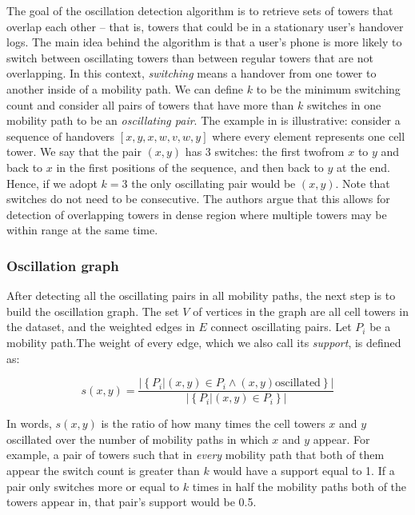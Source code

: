 \documentclass[letterpaper, 11pt, conference]{ieeeconf}
\begin{document}
The goal of the oscillation detection algorithm is to retrieve sets of towers that overlap each other -- that is, towers that could be in a stationary user's handover logs. The main idea behind the algorithm is that a user's phone is more likely to switch between oscillating towers than between regular towers that are not overlapping. In this context, \textit{switching} means a handover from one tower to another inside of a mobility path. We can define $k$ to be the minimum switching count and consider all pairs of towers that have more than $k$ switches in one mobility path to be an \textit{oscillating pair}. The example in \cite{mobilityprofiler} is illustrative: consider a sequence of handovers $\left[x, y, x, w, v, w, y\right]$ where every element represents one cell tower. We say that the pair $(x, y)$ has 3 switches: the first twofrom $x$ to $y$ and back to $x$ in the first positions of the sequence, and then back to $y$ at the end. Hence, if we adopt $k=3$ the only oscillating pair would be $(x, y)$. Note that switches do not need to be consecutive. The authors argue that this allows for detection of overlapping towers in dense region where multiple towers may be within range at the same time.

\subsubsection{Oscillation graph}

After detecting all the oscillating pairs in all mobility paths, the next step is to build the oscillation graph. The set $V$ of vertices in the graph are all cell towers in the dataset, and the weighted edges in $E$ connect oscillating pairs. Let $P_i$ be a mobility path.The weight of every edge, which we also call its \textit{support}, is defined as:

\begin{equation*}
s(x,y) = \frac{|\left\{P_i| (x, y) \in P_i \wedge (x, y) \text{oscillated}\right\}|}{|\left\{P_i| (x, y) \in P_i\right\}|}
\end{equation*}

In words, $s(x,y)$ is the ratio of how many times the cell towers $x$ and $y$ oscillated over the number of mobility paths in which $x$ and $y$ appear. For example, a pair of towers such that in \textit{every} mobility path that both of them appear the switch count is greater than $k$ would have a support equal to 1. If a pair only switches more or equal to $k$ times in half the mobility paths both of the towers appear in, that pair's support would be 0.5.
\end{document}
